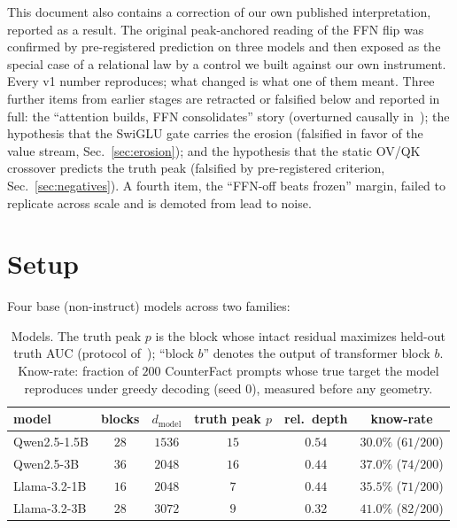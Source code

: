 \documentclass[11pt]{article}
\begin{document}
This document also contains a correction of our own published
interpretation, reported as a result. The original peak-anchored reading of
the FFN flip was confirmed by pre-registered prediction on three models and
then exposed as the special case of a relational law by a control we built
against our own instrument. Every v1 number reproduces; what changed is what
one of them meant. Three further items from earlier stages are retracted or
falsified below and reported in full: the ``attention builds, FFN
consolidates'' story (overturned causally in~\cite{companion}); the
hypothesis that the SwiGLU gate carries the erosion (falsified in favor of
the value stream, Sec.~\ref{sec:erosion}); and the hypothesis that the
static OV/QK crossover predicts the truth peak (falsified by pre-registered
criterion, Sec.~\ref{sec:negatives}). A fourth item, the ``FFN-off beats
frozen'' margin, failed to replicate across scale and is demoted from lead
to noise.

\section{Setup}
\label{sec:setup}

Four base (non-instruct) models across two families:

\begin{table}[H]
\centering
\caption{Models. The truth peak $p$ is the block whose intact residual
maximizes held-out truth AUC (protocol of~\cite{companion}); ``block $b$''
denotes the output of transformer block $b$. Know-rate: fraction of $200$
CounterFact prompts whose true target the model reproduces under greedy
decoding (seed $0$), measured before any geometry.}
\label{tab:models}
\begin{tabular}{lccccc}
\toprule
model & blocks & $d_{\mathrm{model}}$ & truth peak $p$ & rel.\ depth & know-rate \\
\midrule
Qwen2.5-1.5B  & $28$ & $1536$ & $15$ & $0.54$ & $30.0\%$ ($61/200$) \\
Qwen2.5-3B    & $36$ & $2048$ & $16$ & $0.44$ & $37.0\%$ ($74/200$) \\
Llama-3.2-1B  & $16$ & $2048$ & $7$  & $0.44$ & $35.5\%$ ($71/200$) \\
Llama-3.2-3B  & $28$ & $3072$ & $9$  & $0.32$ & $41.0\%$ ($82/200$) \\
\bottomrule
\end{tabular}
\end{table}
\end{document}
